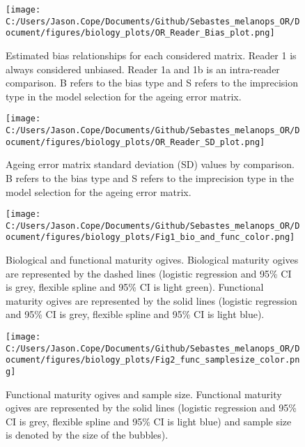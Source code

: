 \documentclass[11pt,
  english,
  letterpaper,
]{article}
\begin{document}
\newpage

\begin{figure}
\centering
\texttt{[image: C:/Users/Jason.Cope/Documents/Github/Sebastes\_melanops\_OR/Document/figures/biology\_plots/OR\_Reader\_Bias\_plot.png]}
\caption{Estimated bias relationships for each considered matrix. Reader 1 is always considered unbiased. Reader 1a and 1b is an intra-reader comparison. B refers to the bias type and S refers to the imprecision type in the model selection for the ageing error matrix.\label{fig:age-error-bias}}
\end{figure}

\newpage

\begin{figure}
\centering
\texttt{[image: C:/Users/Jason.Cope/Documents/Github/Sebastes\_melanops\_OR/Document/figures/biology\_plots/OR\_Reader\_SD\_plot.png]}
\caption{Ageing error matrix standard deviation (SD) values by comparison. B refers to the bias type and S refers to the imprecision type in the model selection for the ageing error matrix.\label{fig:age-error-sd}}
\end{figure}

\newpage

\begin{figure}
\centering
\texttt{[image: C:/Users/Jason.Cope/Documents/Github/Sebastes\_melanops\_OR/Document/figures/biology\_plots/Fig1\_bio\_and\_func\_color.png]}
\caption{Biological and functional maturity ogives. Biological maturity ogives are represented by the dashed lines (logistic regression and 95\% CI is grey, flexible spline and 95\% CI is light green). Functional maturity ogives are represented by the solid lines (logistic regression and 95\% CI is grey, flexible spline and 95\% CI is light blue).\label{fig:bio-fxn-mat-color}}
\end{figure}

\newpage

\begin{figure}
\centering
\texttt{[image: C:/Users/Jason.Cope/Documents/Github/Sebastes\_melanops\_OR/Document/figures/biology\_plots/Fig2\_func\_samplesize\_color.png]}
\caption{Functional maturity ogives and sample size. Functional maturity ogives are represented by the solid lines (logistic regression and 95\% CI is grey, flexible spline and 95\% CI is light blue) and sample size is denoted by the size of the bubbles).\label{fig:fxn-spline-mat-color}}
\end{figure}
\end{document}
